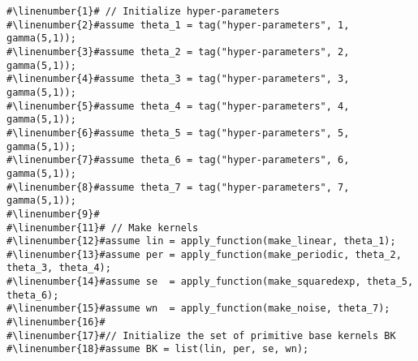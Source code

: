 \begin{mdframed}
\begin{minipage}{\linewidth}
\small
\belowcaptionskip=-10pt
\begin{lstlisting}[mathescape,label=alg:base_kernels,basicstyle=\selectfont\ttfamily,numbers=none,caption={Initialize
Base Kernels BK and $P(n)$},escapechar=\#]
#\linenumber{1}# // Initialize hyper-parameters
#\linenumber{2}#assume theta_1 = tag("hyper-parameters", 1, gamma(5,1));
#\linenumber{3}#assume theta_2 = tag("hyper-parameters", 2, gamma(5,1));
#\linenumber{4}#assume theta_3 = tag("hyper-parameters", 3, gamma(5,1));
#\linenumber{5}#assume theta_4 = tag("hyper-parameters", 4, gamma(5,1));
#\linenumber{6}#assume theta_5 = tag("hyper-parameters", 5, gamma(5,1));
#\linenumber{7}#assume theta_6 = tag("hyper-parameters", 6, gamma(5,1));
#\linenumber{8}#assume theta_7 = tag("hyper-parameters", 7, gamma(5,1));
#\linenumber{9}#
#\linenumber{11}# // Make kernels
#\linenumber{12}#assume lin = apply_function(make_linear, theta_1);
#\linenumber{13}#assume per = apply_function(make_periodic, theta_2, theta_3, theta_4);
#\linenumber{14}#assume se  = apply_function(make_squaredexp, theta_5, theta_6);
#\linenumber{15}#assume wn  = apply_function(make_noise, theta_7);
#\linenumber{16}#
#\linenumber{17}#// Initialize the set of primitive base kernels BK 
#\linenumber{18}#assume BK = list(lin, per, se, wn);
\end{lstlisting}
\end{minipage}
\end{mdframed}

